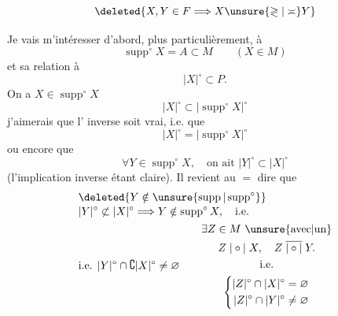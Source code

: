 

\[
\deleted{X,Y\in F\Longrightarrow X\unsure{\gtrless|\asymp}Y}
\]

Je vais m'intéresser d'abord, plus particulièrement, à
\[
\operatorname{supp}^{\circ}X=A\subset M\qquad(X\in M)
\]
et sa relation à
\[
|X|^{\circ}\subset P.
\]
On a $X\in\operatorname{supp}^{\circ}X$ 
\[
|X|^{\circ}\subset|\operatorname{supp}^{\circ}X|^{\circ}
\]
j'aimerais que l' inverse soit vrai, i.e. que
\[
|X|^{\circ}=|\operatorname{supp}^{\circ}X|^{\circ}
\]
ou encore que
\[
\forall Y\in\operatorname{supp}^{\circ}X,\quad\text{on ait }|Y|^{\circ}\subset|X|^{\circ}
\]
(l'implication inverse étant claire).
Il revient au $=$ dire que
\[
\begin{aligned}
&\deleted{Y\notin\unsure{\operatorname{supp}|\operatorname{supp}^{\circ}}}\\[-2pt]
&|Y|^{\circ}\not\subset|X|^{\circ}\Longrightarrow Y\notin\operatorname{supp}^{\circ}X,\quad\text{i.e.}\\
&\text{i.e. }|Y|^{\circ}\cap\complement|X|^{\circ}\neq\varnothing
\qquad\begin{gathered}
\exists Z\in M\ \unsure{\text{avec}|\text{un}}\\
Z\mathrel{|\circ|}X,\quad Z\mathrel{\overline{|\circ|}}Y.\\
\text{i.e.}\\
\left\{\begin{aligned}
|Z|^{\circ}\cap|X|^{\circ}&=\varnothing\\
|Z|^{\circ}\cap|Y|^{\circ}&\neq\varnothing
\end{aligned}\right.
\end{gathered}
\end{aligned}
\]
